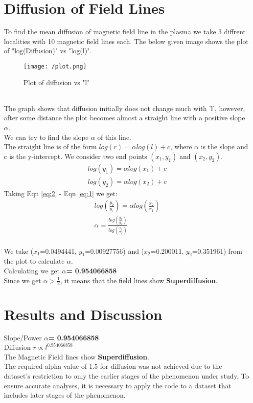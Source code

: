 \documentclass[fleqn]{report}
\begin{document}
	\section{Diffusion of Field Lines}
	To find the mean diffusion of magnetic field line in the plasma we take 3 diffrent localities with 10 magnetic field lines each. The below given image shows the plot of "log(Diffusion)" vs "log(l)".
	\begin{figure}[!ht]
		\centering
		\texttt{[image: /plot.png]}
		\caption{Plot of diffusion vs "l"}
		\label{fig:plot}
	\end{figure}\\
	The graph shows that diffusion initially does not change much with 'l', however, after some distance the plot becomes almost a straight line with a positive slope $\alpha$.\\
	We can try to find the slope $\alpha$ of this line.\\
	The straight line is of the form $log(r)=\alpha log(l) + c$, where $\alpha$ is the slope and c is the y-intercept. We consider two end points $(x_{1},y_{1})$ and $(x_{2},y_{2})$. 
	\begin{align}
		log(y_{1})=\alpha log(x_{1}) + c \label{eq:1}\\
		log(y_{2})=\alpha log(x_{2}) + c \label{eq:2}
	\end{align}
	Taking Eqn \eqref{eq:2} - Eqn \eqref{eq:1} we get:\\
	\begin{align}
		log(\frac{y_{2}}{y_{1}})=\alpha log(\frac{x_{2}}{x_{1}}) \\
		\alpha=\frac{log(\frac{y_{2}}{y_{1}})}{log(\frac{x_{2}}{x_{1}})}
	\end{align}\\
	We take ($x_{1}$=0.0494441, $y_{1}$=0.00927756) and ($x_{2}$=0.200011, $y_{2}$=0.351961) from the plot to calculate $\alpha$.\\
	Calculating we get \textbf{$\alpha$= 0.954066858}\\ 
	Since we get $\alpha > \frac{1}{2}$, it means that the field lines show \textbf{Superdiffusion}.
	\section{Results and Discussion}
	 Slope/Power \textbf{$\alpha$= 0.954066858}\\
	 Diffusion $r\propto l^{0.954066858}$\\
	 The Magnetic Field lines show \textbf{Superdiffusion}.\\
	 The required alpha value of 1.5 for diffusion was not achieved due to the dataset's restriction to only the earlier stages of the phenomenon under study.
	 To ensure accurate analyses, it is necessary to apply the code to a dataset that includes later stages of the phenomenon.	
\end{document}
